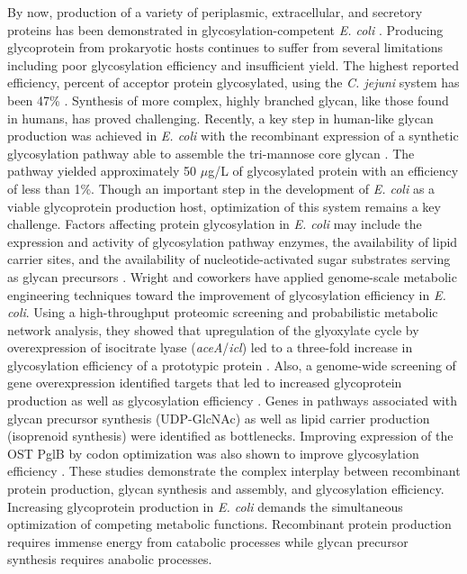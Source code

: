\documentclass[12pt]{article}
\begin{document}
By now, production of a variety of periplasmic, extracellular, and secretory proteins has been demonstrated in glycosylation-competent \textit{E. coli} \cite{2011-fisher-haitjema-delisa-AppEnvMicrobio}. 
Producing glycoprotein from prokaryotic hosts continues to suffer from several limitations including poor glycosylation efficiency and insufficient yield. 
The highest reported efficiency, percent of acceptor protein glycosylated, using the \textit{C. jejuni} system has been 47\% \cite{2011-pandhal-wright-BiotechBioeng}. 
Synthesis of more complex, highly branched glycan, like those found in humans, has proved challenging. 
Recently, a key step in human-like glycan production was achieved in \textit{E. coli} with the recombinant expression of a synthetic glycosylation pathway able to assemble the tri-mannose core glycan \cite{2012-valderrama-rincon-delisa-NatChemBio}. 
The pathway yielded approximately 50 $\mu$g/L of glycosylated protein with an efficiency of less than 1\%. 
Though an important step in the development of \textit{E. coli} as a viable glycoprotein production host, optimization of this system remains a key challenge. 
Factors affecting protein glycosylation in \textit{E. coli} may include the expression and activity of glycosylation pathway enzymes, the availability of lipid carrier sites, and the availability of nucleotide-activated sugar substrates serving as glycan precursors \cite{2013-merritt-fisher-delisa-BiotechBioeng,2014-jaffe-pandhal-wright-CurOpBiotech}. 
Wright and coworkers have applied genome-scale metabolic engineering techniques toward the improvement of glycosylation efficiency in \textit{E. coli}. 
Using a high-throughput proteomic screening and probabilistic metabolic network analysis, they showed that upregulation of the glyoxylate cycle by overexpression of isocitrate lyase (\textit{aceA}/\textit{icl}) led to a three-fold increase in glycosylation efficiency of a prototypic protein \cite{2011-pandhal-wright-BiotechBioeng}. 
Also, a genome-wide screening of gene overexpression identified targets that led to increased glycoprotein production as well as glycosylation efficiency  \cite{2013-pandhal-woodruff-gill-wright-BiotechBioeng}. 
Genes in pathways associated with glycan precursor synthesis (UDP-GlcNAc) as well as lipid carrier production (isoprenoid synthesis) were identified as bottlenecks. 
Improving expression of the OST PglB by codon optimization was also shown to improve glycosylation efficiency \cite{2012-pandhal-wright-BBRC}. 
These studies demonstrate the complex interplay between recombinant protein production, glycan synthesis and assembly, and glycosylation efficiency. 
Increasing glycoprotein production in \textit{E. coli} demands the simultaneous optimization of competing metabolic functions. 
Recombinant protein production requires immense energy from catabolic processes while glycan precursor synthesis requires anabolic processes. 
\end{document}
